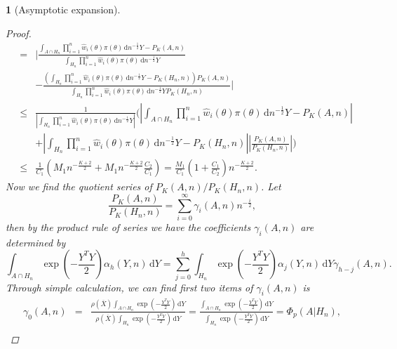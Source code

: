 \documentclass[oneside,english]{amsbook}
\numberwithin{section}{chapter}
\numberwithin{equation}{section}
\numberwithin{figure}{section}
\theoremstyle{plain}
\theoremstyle{plain}
\theoremstyle{definition}
\theoremstyle{plain}
\newtheorem{thm}{\protect\theoremname}
\theoremstyle{plain}
\theoremstyle{remark}
\theoremstyle{definition}
\theoremstyle{definition}
\newcommand{\diff}{\,\mathrm{d}}
\providecommand{\theoremname}{Theorem}
\begin{document}
\begin{thm}[Asymptotic expansion]
\begin{proof}
\begin{eqnarray}
 & = & \Bigg|\frac{\int_{A\cap H_{n}}\prod_{i=1}^{n}\hat{w}_{i}\left(\theta\right)\pi\left(\theta\right)\diff n^{-\frac{1}{2}}Y-P_{K}\left(A,n\right)}{\int_{H_{n}}\prod_{i=1}^{n}\hat{w}_{i}\left(\theta\right)\pi\left(\theta\right)\diff n^{-\frac{1}{2}}Y}\nonumber \\
 &  & -\frac{\left(\int_{H_{n}}\prod_{i=1}^{n}\hat{w}_{i}\left(\theta\right)\pi\left(\theta\right)\diff n^{-\frac{1}{2}}Y-P_{K}\left(H_{n},n\right)\right)P_{K}\left(A,n\right)}{\int_{H_{n}}\prod_{i=1}^{n}\hat{w}_{i}\left(\theta\right)\pi\left(\theta\right)\diff n^{-\frac{1}{2}}YP_{K}\left(H_{n},n\right)}\Bigg|\nonumber \\
 & \le & \frac{1}{\left|\int_{H_{n}}\prod_{i=1}^{n}\hat{w}_{i}\left(\theta\right)\pi\left(\theta\right)\diff n^{-\frac{1}{2}}Y\right|}\Bigg(\left|\int_{A\cap H_{n}}\prod_{i=1}^{n}\hat{w}_{i}\left(\theta\right)\pi\left(\theta\right)\diff n^{-\frac{1}{2}}Y-P_{K}\left(A,n\right)\right|\nonumber \\
 &  & +\left|\int_{H_{n}}\prod_{i=1}^{n}\hat{w}_{i}\left(\theta\right)\pi\left(\theta\right)\diff n^{-\frac{1}{2}}Y-P_{K}\left(H_{n},n\right)\right|\left|\frac{P_{K}\left(A,n\right)}{P_{K}\left(H_{n},n\right)}\right|\Bigg)\nonumber \\
 & \le & \frac{1}{C_{1}}\left(M_{1}n^{-\frac{K+2}{2}}+M_{1}n^{-\frac{K+2}{2}}\frac{C_{2}}{C_{1}}\right)=\frac{M_{1}}{C_{1}}\left(1+\frac{C_{1}}{C_{2}}\right)n^{-\frac{K+2}{2}}.\label{eq:two-quotient-close}
\end{eqnarray}
Now we find the quotient series of $P_{K}\left(A,n\right)/P_{K}\left(H_{n},n\right)$.
Let 
\[
\frac{P_{K}\left(A,n\right)}{P_{K}\left(H_{n},n\right)}=\sum_{i=0}^{\infty}\gamma_{i}\left(A,n\right)n^{-\frac{i}{2}},
\]
then by the product rule of series we have the coefficients $\gamma_{i}\left(A,n\right)$
are determined by 
\[
\int_{A\cap H_{n}}\exp\left(-\frac{Y^{T}Y}{2}\right)\alpha_{h}\left(Y,n\right)\diff Y=\sum_{j=0}^{h}\int_{H_{n}}\exp\left(-\frac{Y^{T}Y}{2}\right)\alpha_{j}\left(Y,n\right)\diff Y\gamma_{h-j}\left(A,n\right).
\]
Through simple calculation, we can find first two items of $\gamma_{i}\left(A,n\right)$
is 
\begin{eqnarray*}
\gamma_{0}\left(A,n\right) & = & \frac{\rho\left(\overline{X}\right)\int_{A\cap H_{n}}\exp\left(-\frac{Y^{T}Y}{2}\right)\diff Y}{\rho\left(\overline{X}\right)\int_{H_{n}}\exp\left(-\frac{Y^{T}Y}{2}\right)\diff Y}=\frac{\int_{A\cap H_{n}}\exp\left(-\frac{Y^{T}Y}{2}\right)\diff Y}{\int_{H_{n}}\exp\left(-\frac{Y^{T}Y}{2}\right)\diff Y}=\Phi_{p}\left(A|H_{n}\right),\\

\end{eqnarray*}
\end{proof}
\end{thm}
\end{document}
